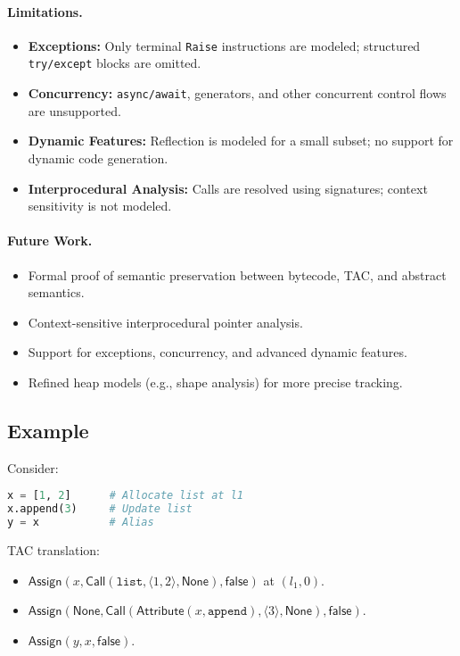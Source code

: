 \paragraph{Limitations.}
\begin{itemize}
    \item \textbf{Exceptions:} Only terminal \texttt{Raise} instructions are modeled; structured \texttt{try/except} blocks are omitted.
    \item \textbf{Concurrency:} \texttt{async/await}, generators, and other concurrent control flows are unsupported.
    \item \textbf{Dynamic Features:} Reflection is modeled for a small subset; no support for dynamic code generation.
    \item \textbf{Interprocedural Analysis:} Calls are resolved using signatures; context sensitivity is not modeled.
\end{itemize}

\paragraph{Future Work.}
\begin{itemize}
    \item Formal proof of semantic preservation between bytecode, TAC, and abstract semantics.
    \item Context-sensitive interprocedural pointer analysis.
    \item Support for exceptions, concurrency, and advanced dynamic features.
    \item Refined heap models (e.g., shape analysis) for more precise tracking.
\end{itemize}

\subsection{Example}

Consider:
\begin{lstlisting}[language=python]
x = [1, 2]      # Allocate list at l1
x.append(3)     # Update list
y = x           # Alias
\end{lstlisting}

TAC translation:
\begin{itemize}
    \item \(\mathsf{Assign}(x,\mathsf{Call}(\mathtt{list},\langle1,2\rangle,\mathsf{None}),\mathsf{false})\) at \((l_1,0)\).
    \item \(\mathsf{Assign}(\mathsf{None},\mathsf{Call}(\mathsf{Attribute}(x,\mathtt{append}),\langle3\rangle,\mathsf{None}),\mathsf{false})\).
    \item \(\mathsf{Assign}(y,x,\mathsf{false})\).
\end{itemize}

